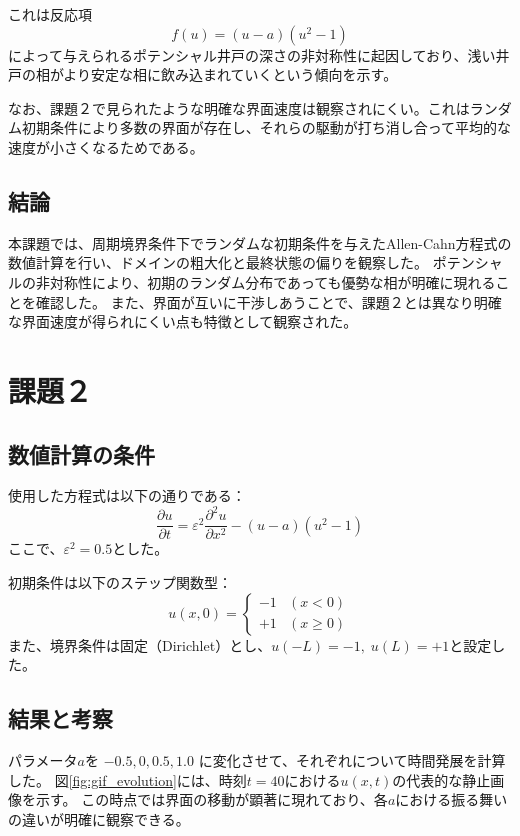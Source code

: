 \documentclass[a4paper,11pt]{article}
\begin{document}
これは反応項
\[
f(u) = (u - a)(u^2 - 1)
\]
によって与えられるポテンシャル井戸の深さの非対称性に起因しており、浅い井戸の相がより安定な相に飲み込まれていくという傾向を示す。

なお、課題２で見られたような明確な界面速度は観察されにくい。これはランダム初期条件により多数の界面が存在し、それらの駆動が打ち消し合って平均的な速度が小さくなるためである。

\subsection{結論}
本課題では、周期境界条件下でランダムな初期条件を与えたAllen-Cahn方程式の数値計算を行い、ドメインの粗大化と最終状態の偏りを観察した。
ポテンシャルの非対称性により、初期のランダム分布であっても優勢な相が明確に現れることを確認した。
また、界面が互いに干渉しあうことで、課題２とは異なり明確な界面速度が得られにくい点も特徴として観察された。

\section{課題２}
\subsection{数値計算の条件}
使用した方程式は以下の通りである：
\[
\frac{\partial u}{\partial t} = \varepsilon^2 \frac{\partial^2 u}{\partial x^2} - (u-a)(u^2 - 1)
\]
ここで、$\varepsilon^2 = 0.5$とした。

初期条件は以下のステップ関数型：
\[
u(x, 0) =
\begin{cases}
-1 & (x < 0) \\
+1 & (x \geq 0)
\end{cases}
\]
また、境界条件は固定（Dirichlet）とし、$u(-L) = -1,\; u(L) = +1$と設定した。
\subsection{結果と考察}
パラメータ$a$を $-0.5, 0, 0.5, 1.0$ に変化させて、それぞれについて時間発展を計算した。
図\ref{fig:gif_evolution}には、時刻$t = 40$における$u(x,t)$の代表的な静止画像を示す。
この時点では界面の移動が顕著に現れており、各$a$における振る舞いの違いが明確に観察できる。
\end{document}
